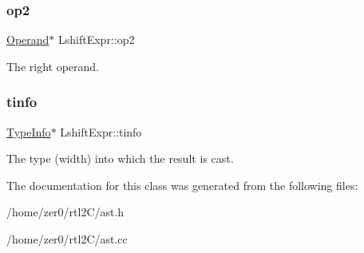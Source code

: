 \subsubsection{\texorpdfstring{op2}{op2}}
{\footnotesize\ttfamily \hyperlink{class_operand}{Operand}$\ast$ Lshift\+Expr\+::op2\hspace{0.3cm}{\ttfamily [protected]}}

The right operand. \mbox{\label{class_lshift_expr_ae5943ee9b52c7124a25a2f43238561af}} 
\subsubsection{\texorpdfstring{tinfo}{tinfo}}
{\footnotesize\ttfamily \hyperlink{class_type_info}{Type\+Info}$\ast$ Lshift\+Expr\+::tinfo\hspace{0.3cm}{\ttfamily [protected]}}

The type (width) into which the result is cast. 

The documentation for this class was generated from the following files\+:\begin{DoxyCompactItemize}
\item 
/home/zer0/rtl2\+C/ast.\+h\item 
/home/zer0/rtl2\+C/ast.\+cc\end{DoxyCompactItemize}
